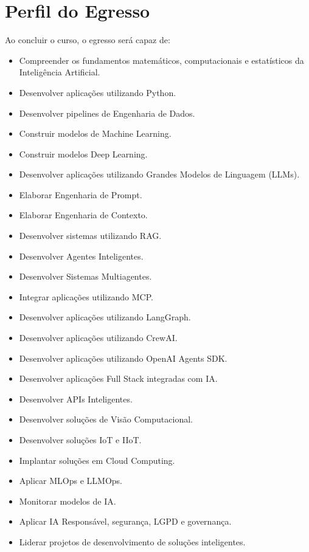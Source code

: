 \section{Perfil do Egresso}

Ao concluir o curso, o egresso será capaz de:
\begin{itemize}
    \item Compreender os fundamentos matemáticos, computacionais e estatísticos da Inteligência Artificial.
    \item Desenvolver aplicações utilizando Python.
    \item Desenvolver pipelines de Engenharia de Dados.
    \item Construir modelos de Machine Learning.
    \item Construir modelos Deep Learning.
    \item Desenvolver aplicações utilizando Grandes Modelos de Linguagem (LLMs).
    \item Elaborar Engenharia de Prompt.
    \item Elaborar Engenharia de Contexto.
    \item Desenvolver sistemas utilizando RAG.
    \item Desenvolver Agentes Inteligentes.
    \item Desenvolver Sistemas Multiagentes.
    \item Integrar aplicações utilizando MCP.
    \item Desenvolver aplicações utilizando LangGraph.
    \item Desenvolver aplicações utilizando CrewAI.
    \item Desenvolver aplicações utilizando OpenAI Agents SDK.
    \item Desenvolver aplicações Full Stack integradas com IA.
    \item Desenvolver APIs Inteligentes.
    \item Desenvolver soluções de Visão Computacional.
    \item Desenvolver soluções IoT e IIoT.
    \item Implantar soluções em Cloud Computing.
    \item Aplicar MLOps e LLMOps.
    \item Monitorar modelos de IA.
    \item Aplicar IA Responsável, segurança, LGPD e governança.
    \item Liderar projetos de desenvolvimento de soluções inteligentes.
\end{itemize}
